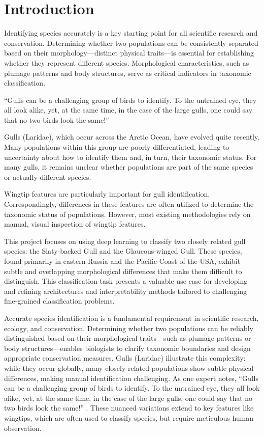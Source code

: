 
\chapter{Introduction}

Identifying species accurately is a key starting point for all scientific research and conservation. Determining whether two populations can be consistently separated based on their morphology—distinct physical traits—is essential for establishing whether they represent different species. Morphological characteristics, such as plumage patterns and body structures, serve as critical indicators in taxonomic classification.

``Gulls can be a challenging group of birds to identify. To the untrained eye, they all look alike, yet, at the same time, in the case of the large gulls, one could say that no two birds look the same!'' \citep{gull_identification}

Gulls (Laridae), which occur across the Arctic Ocean, have evolved quite recently. Many populations within this group are poorly differentiated, leading to uncertainty about how to identify them and, in turn, their taxonomic status. For many gulls, it remains unclear whether populations are part of the same species or actually different species.

Wingtip features are particularly important for gull identification. Correspondingly, differences in these features are often utilized to determine the taxonomic status of populations. However, most existing methodologies rely on manual, visual inspection of wingtip features.

This project focuses on using deep learning to classify two closely related gull species: the Slaty-backed Gull and the Glaucous-winged Gull. These species, found primarily in eastern Russia and the Pacific Coast of the USA, exhibit subtle and overlapping morphological differences that make them difficult to distinguish. This classification task presents a valuable use case for developing and refining architectures and interpretability methods tailored to challenging fine-grained classification problems.

Accurate species identification is a fundamental requirement in scientific research, ecology, and conservation. Determining whether two populations can be reliably distinguished based on their morphological traits—such as plumage patterns or body structures—enables biologists to clarify taxonomic boundaries and design appropriate conservation measures. Gulls (Laridae) illustrate this complexity: while they occur globally, many closely related populations show subtle physical differences, making manual identification challenging. As one expert notes, ``Gulls can be a challenging group of birds to identify. To the untrained eye, they all look alike, yet, at the same time, in the case of the large gulls, one could say that no two birds look the same!'' \citep{gull_identification}. These nuanced variations extend to key features like wingtips, which are often used to classify species, but require meticulous human observation.

